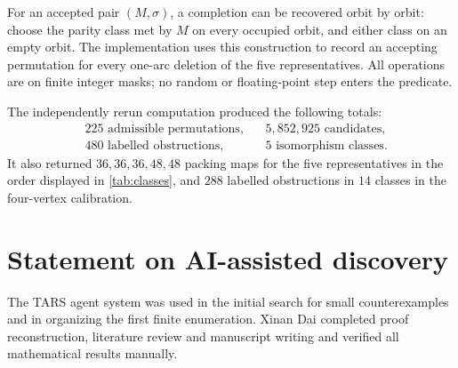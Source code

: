 \documentclass[11pt,reqno]{amsart}
\theoremstyle{definition}
\begin{document}
For an accepted pair \((M,\sigma)\), a completion can be recovered orbit by orbit: choose the parity class met by \(M\) on every occupied orbit, and either class on an empty orbit. The implementation uses this construction to record an accepting permutation for every one-arc deletion of the five representatives. All operations are on finite integer masks; no random or floating-point step enters the predicate.

The independently rerun computation produced the following totals:
\[
\begin{aligned}
&225\text{ admissible permutations},
&&5{,}852{,}925\text{ candidates},\\
&480\text{ labelled obstructions},
&&5\text{ isomorphism classes}.
\end{aligned}
\]
It also returned \(36,36,36,48,48\) packing maps for the five representatives in the order displayed in \cref{tab:classes}, and \(288\) labelled obstructions in \(14\) classes in the four-vertex calibration.

\section*{Statement on AI-assisted discovery}
The TARS agent system was used in the initial search for small counterexamples and in organizing the first finite enumeration. Xinan Dai completed proof reconstruction, literature review and manuscript writing and verified all mathematical results manually.



\end{document}
